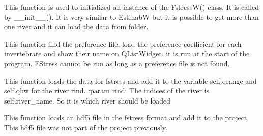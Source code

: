 \documentclass[letterpaper,10pt,english]{sphinxmanual}
\begin{document}
\begin{fulllineitems}
\begin{fulllineitems}
\label{\detokenize{index:src_GUI.fstress_GUI.FstressW.init_iu}}
This function is used to initialized an instance of the FstressW() class. It is called by \_\_init\_\_().
It is very similar to EstihabW but it is possible to get more than one river and it can load the data from
folder.

\end{fulllineitems}


\begin{fulllineitems}
\label{\detokenize{index:src_GUI.fstress_GUI.FstressW.load_all_fish}}
This function find the preference file, load the preference coefficient for each invertebrate and show their name
on QListWidget. it is run at the start of the program. FStress cannot be run as long as a preference file is not
found.

\end{fulllineitems}


\begin{fulllineitems}
\label{\detokenize{index:src_GUI.fstress_GUI.FstressW.load_data_fstress}}
This function loads the data for fstress and add it to the variable self.qrange and self.qhw for the river
rind.
:param rind: The indices of the river is self.river\_name. So it is which river should be loaded

\end{fulllineitems}


\begin{fulllineitems}
\label{\detokenize{index:src_GUI.fstress_GUI.FstressW.load_hdf5_fstress}}
This function loads an hdf5 file in the fstress format and add it to the project. This hdf5 file was not part of
the project previously.

\end{fulllineitems}



\end{fulllineitems}
\end{document}

